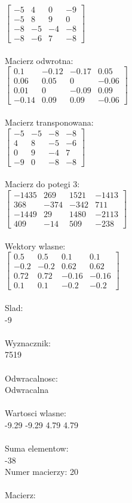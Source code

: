 \documentclass[a4paper,12pt]{article}
\begin{document}
$\begin{bmatrix} -5&4&0&-9\\-5&8&9&0\\-8&-5&-4&-8\\-8&-6&7&-8 \end{bmatrix}$
\\
\\
Macierz odwrotna:\\

$\begin{bmatrix} 0.1&-0.12&-0.17&0.05\\0.06&0.05&0&-0.06\\0.01&0&-0.09&0.09\\-0.14&0.09&0.09&-0.06 \end{bmatrix}$
\\
\\
Macierz transponowana:\\

$\begin{bmatrix} -5&-5&-8&-8\\4&8&-5&-6\\0&9&-4&7\\-9&0&-8&-8 \end{bmatrix}$
\\
\\
Macierz do potegi 3:\\

$\begin{bmatrix} -1435&269&1521&-1413\\368&-374&-342&711\\-1449&29&1480&-2113\\409&-14&509&-238 \end{bmatrix}$
\\
\\
Wektory wlasne:\\

$\begin{bmatrix} 0.5&0.5&0.1&0.1\\-0.2&-0.2&0.62&0.62\\0.72&0.72&-0.16&-0.16\\0.1&0.1&-0.2&-0.2 \end{bmatrix}$
\\
\\
Slad:\\
-9
\\
\\
Wyznacznik:\\
7519
\\
\\
Odwracalnosc:\\
Odwracalna
\\
\\
Wartosci wlasne:\\
-9.29 -9.29 4.79 4.79
\\
\\
Suma elementow:\\
-38
\\
\newpage
Numer macierzy:
20
\\
\\
Macierz:\\
\end{document}

